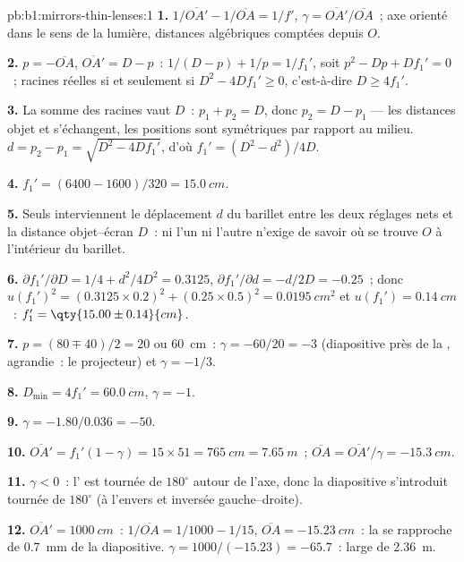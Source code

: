 \begin{solution}{pb:b1:mirrors-thin-lenses:1}
\textbf{1.} $1/\overline{OA'} - 1/\overline{OA} = 1/f'$,
$\gamma = \overline{OA'}/\overline{OA}$~; axe orienté dans le sens de la
lumière, distances algébriques comptées depuis $O$.

\textbf{2.} $p = -\overline{OA}$, $\overline{OA'} = D - p$~:
$1/(D - p) + 1/p = 1/f_1'$, soit $p^2 - Dp + Df_1' = 0$~; racines réelles si et seulement si
$D^2 - 4Df_1' \geq 0$, c'est-à-dire $D \geq 4f_1'$.

\textbf{3.} La somme des racines vaut $D$~: $p_1 + p_2 = D$, donc $p_2 = D - p_1$ ---
les distances objet et  s'échangent, les positions sont symétriques
par rapport au milieu. $d = p_2 - p_1 = \sqrt{D^2 - 4Df_1'}$, d'où $f_1' = (D^2 -
d^2)/4D$.

\textbf{4.} $f_1' = (6400 - 1600)/320 = \qty{15.0}{cm}$.

\textbf{5.} Seuls interviennent le déplacement $d$ du barillet entre les
deux réglages nets et la distance objet--écran $D$~: ni l'un ni l'autre
n'exige de savoir où se trouve $O$ à l'intérieur du barillet.

\textbf{6.} $\partial f_1'/\partial D = 1/4 + d^2/4D^2 = 0.3125$,
$\partial f_1'/\partial d = -d/2D = -0.25$~; donc
$u(f_1')^2 = (0.3125 \times 0.2)^2 + (0.25 \times 0.5)^2 =
\qty{0.0195}{cm^2}$ et $u(f_1') = \qty{0.14}{cm}$~:
$f_1' = \qty{15.00\pm0.14}{cm}$.

\textbf{7.} $p = (80 \mp 40)/2 = 20$ ou \qty{60}{cm}~: $\gamma =
-60/20 = -3$ (diapositive près de la ,  agrandie~: le
projecteur) et $\gamma = -1/3$.

\textbf{8.} $D_{\min} = 4f_1' = \qty{60.0}{cm}$, $\gamma = -1$.

\textbf{9.} $\gamma = -1.80/0.036 = -50$.

\textbf{10.} $\overline{OA'} = f_1'(1 - \gamma) = 15 \times 51 =
\qty{765}{cm} = \qty{7.65}{m}$~; $\overline{OA} = \overline{OA'}/\gamma =
\qty{-15.3}{cm}$.

\textbf{11.} $\gamma < 0$~: l' est tournée de $180^\circ$
autour de l'axe, donc la diapositive s'introduit tournée de $180^\circ$
(à l'envers et inversée gauche--droite).

\textbf{12.} $\overline{OA'} = \qty{1000}{cm}$~: $1/\overline{OA} = 1/1000
- 1/15$, $\overline{OA} = \qty{-15.23}{cm}$~: la  se rapproche de
\qty{0.7}{mm} de la diapositive. $\gamma = 1000/(-15.23) = -65.7$~: 
large de \qty{2.36}{m}.


\end{solution}
